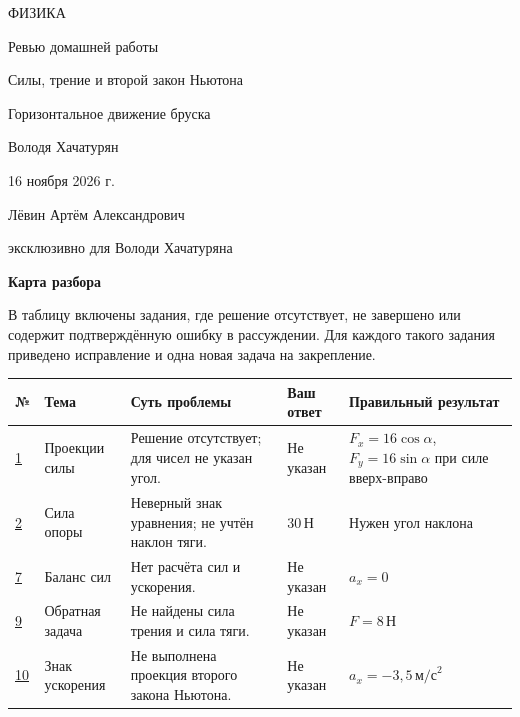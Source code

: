 \documentclass[a4paper,12pt]{article}
\begin{document}
\thispagestyle{empty}
\begin{center}
\vspace*{29mm}
{\color{deepaccent}\large ФИЗИКА}\par
\vspace{17mm}
{\fontsize{25}{30}\selectfont Ревью домашней работы}\par
\vspace{11mm}
{\Large\color{accent}Силы, трение и второй закон Ньютона}\par
\vspace{8mm}
{\normalsize Горизонтальное движение бруска}\par
\vfill
{\large Володя Хачатурян}\par
\vspace{11mm}
16 ноября 2026 г.\par
\vspace{25mm}
{\small Лёвин Артём Александрович}\par
{\small эксклюзивно для Володи Хачатуряна}\par
\vspace{24mm}
\vspace*{8mm}
\end{center}
\clearpage

{\Large\bfseries\color{deepaccent}Карта разбора}\par
\vspace{1mm}
В таблицу включены задания, где решение отсутствует, не завершено или содержит подтверждённую ошибку в рассуждении. Для каждого такого задания приведено исправление и одна новая задача на закрепление.

\renewcommand{\arraystretch}{1.25}
\small
\begin{tabularx}{\linewidth}{@{}>{\centering\arraybackslash}p{11mm}p{25mm}X>{\raggedright\arraybackslash}p{25mm}>{\raggedright\arraybackslash}p{29mm}@{}}
\toprule
№ & Тема & Суть проблемы & Ваш ответ & Правильный результат \\
\midrule
\hyperref[task:1]{1} & Проекции силы & Решение отсутствует; для чисел не указан угол. & Не указан & $F_x=16\cos\alpha$, $F_y=16\sin\alpha$ при силе вверх-вправо \\
\hyperref[task:2]{2} & Сила опоры & Неверный знак уравнения; не учтён наклон тяги. & $30\,\text{Н}$ & Нужен угол наклона \\
\hyperref[task:7]{7} & Баланс сил & Нет расчёта сил и ускорения. & Не указан & $a_x=0$ \\
\hyperref[task:9]{9} & Обратная задача & Не найдены сила трения и сила тяги. & Не указан & $F=8\,\text{Н}$ \\
\hyperref[task:10]{10} & Знак ускорения & Не выполнена проекция второго закона Ньютона. & Не указан & $a_x=-3{,}5\,\text{м/с}^2$ \\
\bottomrule
\end{tabularx}
\normalsize
\end{document}
